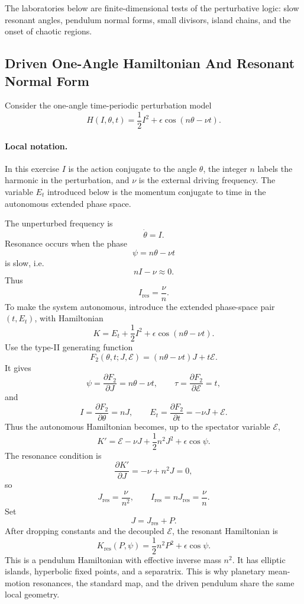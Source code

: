 The laboratories below are finite-dimensional tests of the perturbative logic:
slow resonant angles, pendulum normal forms, small divisors, island chains, and
the onset of chaotic regions.

\subsection{Driven One-Angle Hamiltonian And Resonant Normal Form}
\label{sec:detailed-driven-resonance}

Consider the one-angle time-periodic perturbation model
\[
  H(I,\theta,t)
  =
  \frac12I^2+\epsilon\cos(n\theta-\nu t).
\]

\paragraph{Local notation.}
In this exercise \(I\) is the action conjugate to the angle \(\theta\), the
integer \(n\) labels the harmonic in the perturbation, and \(\nu\) is the
external driving frequency.  The variable \(E_t\) introduced below is the
momentum conjugate to time in the autonomous extended phase space.

The unperturbed frequency is
\[
  \dot\theta=I.
\]
Resonance occurs when the phase
\[
  \psi=n\theta-\nu t
\]
is slow, i.e.
\[
  nI-\nu\approx0.
\]
Thus
\[
  I_{\mathrm{res}}=\frac{\nu}{n}.
\]
To make the system autonomous, introduce the extended phase-space pair
\((t,E_t)\), with Hamiltonian
\[
  K=E_t+\frac12I^2+\epsilon\cos(n\theta-\nu t).
\]
Use the type-II generating function
\[
  F_2(\theta,t;J,\mathcal E)
  =
  (n\theta-\nu t)J+t\mathcal E.
\]
It gives
\[
  \psi=\frac{\partial F_2}{\partial J}=n\theta-\nu t,
  \qquad
  \tau=\frac{\partial F_2}{\partial \mathcal E}=t,
\]
and
\[
  I=\frac{\partial F_2}{\partial\theta}=nJ,
  \qquad
  E_t=\frac{\partial F_2}{\partial t}=-\nu J+\mathcal E.
\]
Thus the autonomous Hamiltonian becomes, up to the spectator variable
\(\mathcal E\),
\[
  K'=\mathcal E-\nu J+\frac12n^2J^2+\epsilon\cos\psi.
\]
The resonance condition is
\[
  \frac{\partial K'}{\partial J}=-\nu+n^2J=0,
\]
so
\[
  J_{\mathrm{res}}=\frac{\nu}{n^2},
  \qquad
  I_{\mathrm{res}}=nJ_{\mathrm{res}}=\frac{\nu}{n}.
\]
Set
\[
  J=J_{\mathrm{res}}+P.
\]
After dropping constants and the decoupled \(\mathcal E\), the resonant
Hamiltonian is
\[
  \boxed{
  K_{\mathrm{res}}(P,\psi)
  =
  \frac12 n^2P^2+\epsilon\cos\psi.
  }
\]
This is a pendulum Hamiltonian with effective inverse mass \(n^2\). It has
elliptic islands, hyperbolic fixed points, and a separatrix. This is why
planetary mean-motion resonances, the standard map, and the driven pendulum
share the same local geometry.

